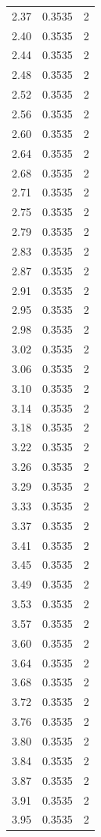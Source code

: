 \begin{longtable}{lrr}
  2.37 & 0.3535 & 2 \\
  2.40 & 0.3535 & 2 \\
  2.44 & 0.3535 & 2 \\
  2.48 & 0.3535 & 2 \\
  2.52 & 0.3535 & 2 \\
  2.56 & 0.3535 & 2 \\
  2.60 & 0.3535 & 2 \\
  2.64 & 0.3535 & 2 \\
  2.68 & 0.3535 & 2 \\
  2.71 & 0.3535 & 2 \\
  2.75 & 0.3535 & 2 \\
  2.79 & 0.3535 & 2 \\
  2.83 & 0.3535 & 2 \\
  2.87 & 0.3535 & 2 \\
  2.91 & 0.3535 & 2 \\
  2.95 & 0.3535 & 2 \\
  2.98 & 0.3535 & 2 \\
  3.02 & 0.3535 & 2 \\
  3.06 & 0.3535 & 2 \\
  3.10 & 0.3535 & 2 \\
  3.14 & 0.3535 & 2 \\
  3.18 & 0.3535 & 2 \\
  3.22 & 0.3535 & 2 \\
  3.26 & 0.3535 & 2 \\
  3.29 & 0.3535 & 2 \\
  3.33 & 0.3535 & 2 \\
  3.37 & 0.3535 & 2 \\
  3.41 & 0.3535 & 2 \\
  3.45 & 0.3535 & 2 \\
  3.49 & 0.3535 & 2 \\
  3.53 & 0.3535 & 2 \\
  3.57 & 0.3535 & 2 \\
  3.60 & 0.3535 & 2 \\
  3.64 & 0.3535 & 2 \\
  3.68 & 0.3535 & 2 \\
  3.72 & 0.3535 & 2 \\
  3.76 & 0.3535 & 2 \\
  3.80 & 0.3535 & 2 \\
  3.84 & 0.3535 & 2 \\
  3.87 & 0.3535 & 2 \\
  3.91 & 0.3535 & 2 \\
  3.95 & 0.3535 & 2 \\

\end{longtable}
